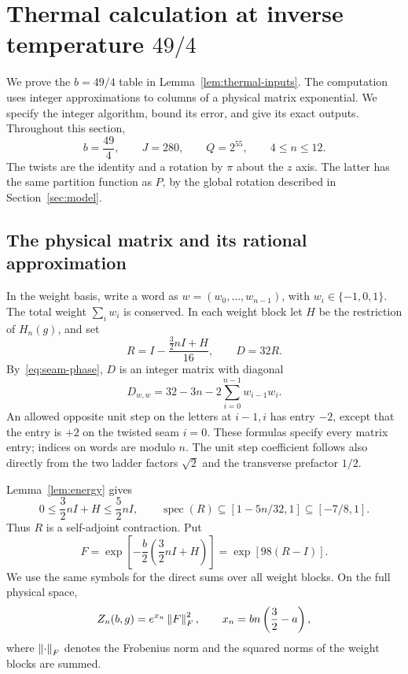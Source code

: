 \section{Thermal calculation at inverse temperature \texorpdfstring{$49/4$}{49/4}}
\label{sec:thermal72}

We prove the $b=49/4$ table in Lemma~\ref{lem:thermal-inputs}. The computation
uses integer approximations to columns of a physical matrix exponential.
We specify the integer algorithm, bound its error, and give its exact
outputs. Throughout this section,
\[
 b=\frac{49}{4},\qquad J=280,\qquad Q=2^{55},\qquad 4\le n\le12.
\]
The twists are the identity and a rotation by \(\pi\) about the \(z\) axis.
The latter has the same partition function as \(P\), by the global rotation
described in Section~\ref{sec:model}.

\subsection{The physical matrix and its rational approximation}

In the weight basis, write a word as \(w=(w_0,\ldots,w_{n-1})\), with
\(w_i\in\{-1,0,1\}\). The total weight \(\sum_iw_i\) is conserved.
In each weight block let \(H\) be the restriction of \(H_n(g)\), and set
\begin{equation}\label{eq:thermal72-matrix}
 R=I-\frac{\frac32nI+H}{16},\qquad D=32R.
\end{equation}
By~\eqref{eq:seam-phase}, \(D\) is an integer matrix with diagonal
\[
 D_{w,w}=32-3n-2\sum_{i=0}^{n-1}w_{i-1}w_i.
\]
An allowed opposite unit step on the letters at \(i-1,i\) has entry
\(-2\), except that the entry is \(+2\) on the twisted seam \(i=0\).
These formulas specify every matrix entry; indices on words are modulo
\(n\). The unit step coefficient follows also directly from the two
ladder factors \(\sqrt2\) and the transverse prefactor \(1/2\).

Lemma~\ref{lem:energy} gives
\[
 0\le \frac32nI+H\le\frac52nI,\qquad
 \operatorname{spec}(R)\subseteq[1-5n/32,1]\subseteq[-7/8,1].
\]
Thus \(R\) is a self-adjoint contraction. Put
\[
 F=\exp\!\left[-\frac b2\left(\frac32nI+H\right)\right]
   =\exp[98(R-I)].
\]
We use the same symbols for the direct sums over all weight blocks.
On the full physical space,
\begin{equation}\label{eq:thermal72-trace}
 Z_n(b,g)=e^{x_n}\left\lVert F\right\rVert_F^2,\qquad
 x_n=bn\left(\frac32-a\right),
\end{equation}
where \(\left\lVert \cdot\right\rVert_F\) denotes the Frobenius norm and the squared norms
of the weight blocks are summed.


